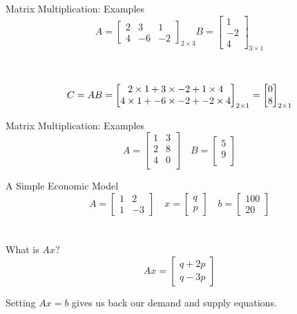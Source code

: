 \documentclass{./../../Latex/teaching_slides}
\begin{document}
\begin{frame}{Matrix Multiplication: Examples}
$$A = \begin{bmatrix}
2 & 3 & 1 \\
4 & -6 & -2
\end{bmatrix}_{2 \times 3}
B = \begin{bmatrix}
1 \\
-2 \\
4
\end{bmatrix}_{3 \times 1}$$ 
\\~\\
\pause
$$C = AB =  \begin{bmatrix}
2 \times 1 + 3 \times -2 + 1 \times 4  \\
4 \times 1 + -6 \times -2 + -2 \times 4  \\
\end{bmatrix}_{2 \times 1} = 
\begin{bmatrix}
0  \\
8  \\
\end{bmatrix}_{2 \times 1} \vspace{1cm}$$
\end{frame}

\begin{frame}{Matrix Multiplication: Examples}
$$A = \begin{bmatrix}
1 & 3  \\
2 & 8 \\
4 & 0 \\
\end{bmatrix} \quad
B = \begin{bmatrix}
5 \\
9 \\
\end{bmatrix}$$ 
\end{frame}

\begin{frame}{A Simple Economic Model}
$$A = \begin{bmatrix}
1 & 2 \\
1 & -3 
\end{bmatrix} \quad 
x = \begin{bmatrix}
q \\
p 
\end{bmatrix} \quad 
b = \begin{bmatrix}
100 \\
20 
\end{bmatrix}$$
\\~\\

What is $Ax$? 
\pause
$$Ax = \begin{bmatrix}
q + 2p\\
q-3p
\end{bmatrix}$$
\vspace{1em}
\pause

Setting $Ax=b$ gives us back our demand and supply equations. 
\end{frame}
\end{document}
